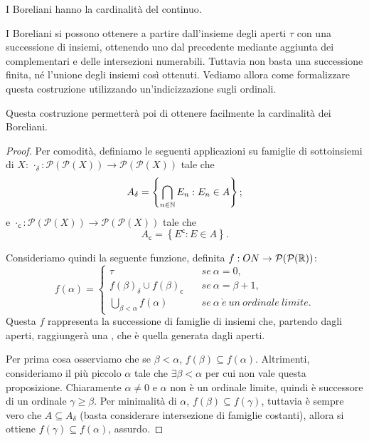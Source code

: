 \begin{proposition}\label{CardBoreliani}
	I Boreliani hanno la cardinalità del continuo.
\end{proposition}
\begin{remark}
	I Boreliani si possono ottenere a partire dall'insieme degli aperti $\tau$ con una successione di insiemi, ottenendo uno dal precedente
	mediante aggiunta dei complementari e delle intersezioni numerabili. Tuttavia non basta una successione finita, né l'unione degli insiemi
	così ottenuti. Vediamo allora come formalizzare questa costruzione utilizzando un'indicizzazione sugli ordinali.
	
	Questa costruzione permetterà poi di ottenere facilmente la cardinalità dei Boreliani.
\end{remark}
\begin{proof}
	Per comodità, definiamo le seguenti applicazioni su famiglie di sottoinsiemi di $X$:
	$\cdot_{\delta}:\mathcal{P}(\mathcal{P}(X)) \rightarrow \mathcal{P}(\mathcal{P}(X))$ tale che
	\[
		A_{\delta} = \left\{ \bigcap_{n\in\mathbb N}E_n : E_n\in A \right\};
	\]
	e $\cdot_{\mathsf{c}}:\mathcal{P}(\mathcal{P}(X)) \rightarrow \mathcal{P}(\mathcal{P}(X))$ tale che
	\[
		A_{\mathsf{c}} = \left\{ E^\mathsf{c} : E\in A \right\}.
	\]
	
	Consideriamo quindi la seguente funzione, definita $f:ON \rightarrow \mathcal{P}(\mathcal{P}(\mathbb R))$:
	\[
	f(\alpha) = \left\{
		\begin{array}{ll}
			\tau & \quad se\ \alpha=0, \\
			f(\beta)_{\delta}\cup f(\beta)_{\mathsf{c}} & \quad se\ \alpha=\beta+1,\\
			\bigcup_{\beta < \alpha}f(\alpha) & \quad se\ \alpha\ \grave{e}\ un\ ordinale\ limite.
		\end{array}
	\right.
	\]
	Questa $f$ rappresenta la successione di famiglie di insiemi che, partendo dagli aperti, raggiungerà una \sigalg,
	che è quella generata dagli aperti.
	
	Per prima cosa osserviamo che se $\beta < \alpha$, $f(\beta)\subseteq f(\alpha)$. Altrimenti, consideriamo il più piccolo $\alpha$
	tale che $\exists \beta<\alpha$ per cui non vale questa proposizione. Chiaramente $\alpha\neq 0$ e $\alpha$ non è un ordinale limite,
	quindi è successore di un ordinale $\gamma\geq \beta$. Per minimalità di $\alpha$, $f(\beta)\subseteq f(\gamma)$, tuttavia è sempre vero
	che $A\subseteq A_{\delta}$ (basta considerare intersezione di famiglie costanti), allora si ottiene $f(\gamma)\subseteq f(\alpha)$, assurdo.
	

\end{proof}
